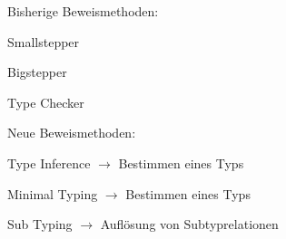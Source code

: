 {
    \begin{itemgroup}{Bisherige Beweismethoden:}
	\item Smallstepper
	\item Bigstepper
	\item Type Checker
	\end{itemgroup}
    
	\begin{itemgroup}{Neue Beweismethoden:}
	\item Type Inference $\to$ Bestimmen eines Typs
	\item Minimal Typing $\to$ Bestimmen eines Typs
	\item Sub Typing $\to$ Auflösung von Subtyprelationen
	\end{itemgroup}
  
}